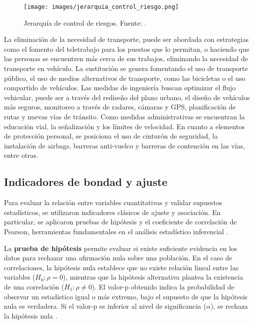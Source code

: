 \documentclass[12pt]{article}
\begin{document}
\begin{figure}[h]
    \centering
    \texttt{[image: images/jerarquia\_control\_riesgo.png]}
    \caption{Jerarquía de control de riesgos. Fuente: \citet{niosh2024}.}
    \label{fig:jerarquia_riesgos}
\end{figure}

La eliminación de la necesidad de transporte, puede ser abordada con estrategias como el fomento del teletrabajo para los puestos que lo permitan, o haciendo que las personas se encuentren más cerca de sus trabajos, eliminando la necesidad de transporte en vehículo. La sustitución se genera fomentando el uso de transporte público, el uso de medios alternativos de transporte, como las bicicletas o el uso compartido de vehículos. Las medidas de ingeniería buscan optimizar el flujo vehicular, puede ser a través del rediseño del plano urbano, el diseño de vehículos más seguros, monitoreo a través de radares, cámaras y GPS, planificación de rutas y nuevas vías de tránsito. Como medidas administrativas se encuentran la educación vial, la señalización y los límites de velocidad. En cuanto a elementos de protección personal, se posiciona el uso de cinturón de seguridad, la instalación de airbags, barreras anti-vuelco y barreras de contención en las vías, entre otras.

\subsection{Indicadores de bondad y ajuste}

Para evaluar la relación entre variables cuantitativas y validar supuestos estadísticos, se utilizaron indicadores clásicos de ajuste y asociación. En particular, se aplicaron pruebas de hipótesis y el coeficiente de correlación de Pearson, herramientas fundamentales en el análisis estadístico inferencial \citep{devore2011, montgomery2012}.

La \textbf{prueba de hipótesis} permite evaluar si existe suficiente evidencia en los datos para rechazar una afirmación nula sobre una población. En el caso de correlaciones, la hipótesis nula establece que no existe relación lineal entre las variables (\( H_0 : \rho = 0 \)), mientras que la hipótesis alternativa plantea la existencia de una correlación (\( H_1 : \rho \neq 0 \)). El valor-p obtenido indica la probabilidad de observar un estadístico igual o más extremo, bajo el supuesto de que la hipótesis nula es verdadera. Si el valor-p es inferior al nivel de significancia (\( \alpha \)), se rechaza la hipótesis nula \citep{devore2011}.
\end{document}
